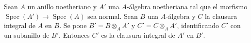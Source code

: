 \begin{proposition}[6.14.4]
Sean $A$ un anillo noetheriano y $A'$ una $A$-álgebra noetheriana tal
que el morfismo
$\operatorname{Spec}(A')\to\operatorname{Spec}(A)$ sea normal. Sean
$B$ una $A$-álgebra y $C$ la clausura integral de $A$ en $B$.
Se pone $B'=B\otimes_A A'$ y $C'=C\otimes_A A'$, identificando
$C'$ con un subanillo de $B'$. Entonces $C'$ es la clausura integral
de $A'$ en $B'$.
\end{proposition}

